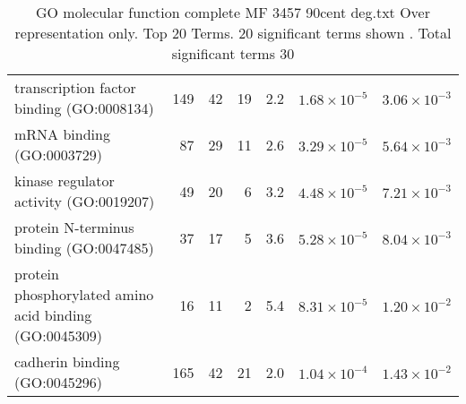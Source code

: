 \begin{table}[ht]
\begin{adjustbox}{width=\textwidth}
\begin{tabular}{lrrrrrr}
  transcription factor binding (GO:0008134) & 149 & 42 & 19 & 2.2 & $1.68 \times 10^{-5}$ & $3.06 \times 10^{-3}$ \\ 
  mRNA binding (GO:0003729) & 87 & 29 & 11 & 2.6 & $3.29 \times 10^{-5}$ & $5.64 \times 10^{-3}$ \\ 
  kinase regulator activity (GO:0019207) & 49 & 20 & 6 & 3.2 & $4.48 \times 10^{-5}$ & $7.21 \times 10^{-3}$ \\ 
  protein N-terminus binding (GO:0047485) & 37 & 17 & 5 & 3.6 & $5.28 \times 10^{-5}$ & $8.04 \times 10^{-3}$ \\ 
  protein phosphorylated amino acid binding (GO:0045309) & 16 & 11 & 2 & 5.4 & $8.31 \times 10^{-5}$ & $1.20 \times 10^{-2}$ \\ 
  cadherin binding (GO:0045296) & 165 & 42 & 21 & 2.0 & $1.04 \times 10^{-4}$ & $1.43 \times 10^{-2}$ \\ 
   \hline
\end{tabular}
\end{adjustbox}
\caption{GO molecular function complete MF 3457 90cent deg.txt Over representation only. Top 20 Terms. 20 significant terms shown . Total significant terms 30} 
\label{tab:GO molecular function complete MF 3457 90cent deg.txt Over representation only. Top 20 Terms. 20 significant terms shown . Total significant terms 30}
\end{table}


\clearpage

